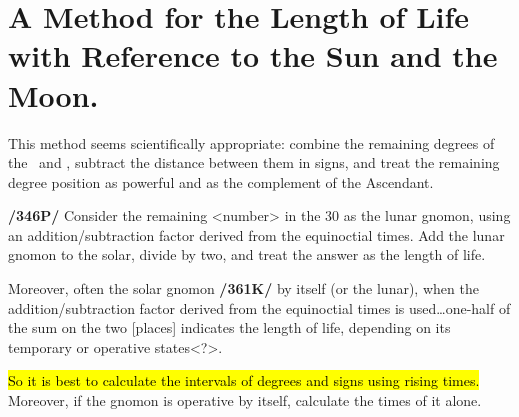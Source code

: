 \section{A Method for the Length of Life with Reference to the Sun and the Moon.}

This method seems scientifically appropriate: combine the remaining degrees of the \Sun\, and \Moon, subtract the distance between them in signs, and treat the remaining degree position as powerful and as the
complement of the Ascendant. 

\textbf{/346P/} Consider the remaining <number> in the 30 as the lunar gnomon, using an addition/subtraction factor derived from the equinoctial times. Add the lunar gnomon to the solar, divide by two, and treat the answer as the length of life. 

Moreover, often the solar gnomon \textbf{/361K/} by itself (or the lunar), when the addition/subtraction factor derived from the equinoctial times is used…one-half of the sum on the two [places] indicates the length of life, depending on its temporary or operative states<?>.

\hl{So it is best to calculate the intervals of degrees and signs using rising times.} Moreover, if the gnomon is operative by itself, calculate the times of it alone.

\newpage